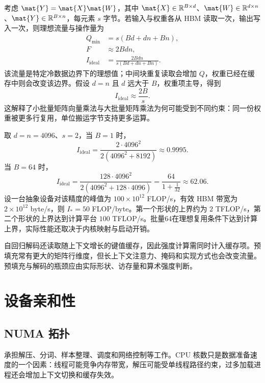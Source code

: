 \documentclass[../textbook.tex]{subfiles}
\begin{document}
\begin{example}[矩阵乘法的批量与算术强度]


考虑 $\mat{Y}=\mat{X}\mat{W}$，其中 $\mat{X}\in\mathbb R^{B\times d}$、$\mat{W}\in\mathbb R^{d\times n}$、$\mat{Y}\in\mathbb R^{B\times n}$，每元素 $s$ 字节。若输入与权重各从 HBM 读取一次，输出写入一次，则理想流量与操作量为
\begin{align*}
 Q_{\min} &= s(Bd+dn+Bn), \\
 F &\approx 2Bdn, \\
 I_{\mathrm{ideal}} &= \frac{2Bdn}{s(Bd+dn+Bn)}.
\end{align*}
该流量是特定冷数据边界下的理想值；中间块重复读取会增加 $Q$，权重已经在缓存中则会改变该边界。假设 $d=n$ 且 $d$ 远大于 $B$，权重项主导，得到
\begin{equation*}
 I_{\mathrm{ideal}}\approx\frac{2B}{s}.
\end{equation*}
这解释了小批量矩阵向量乘法与大批量矩阵乘法为何可能受到不同约束：同一份权重被更多行复用，单位搬运字节支持更多运算。

取 $d=n=4096$、$s=2$，当 $B=1$ 时，
\begin{equation*}
 I_{\mathrm{ideal}}=\frac{2\cdot4096^2}{2(4096^2+8192)}\approx0.9995.
\end{equation*}
当 $B=64$ 时，
\begin{equation*}
 I_{\mathrm{ideal}}=\frac{128\cdot4096^2}{2(4096^2+128\cdot4096)}
 =\frac{64}{1+\frac{1}{32}}\approx62.06.
\end{equation*}
设一台抽象设备对该精度的峰值为 $100\times10^{12}$ FLOP/s，有效 HBM 带宽为 $2\times10^{12}$ byte/s，则 $I_*=50$ FLOP/byte。第一个形状的上界约为 $2$ TFLOP/s，第二个形状的上界达到计算平台 $100$ TFLOP/s。批量64在理想复用条件下达到计算上界，实际性能还取决于内核映射与启动开销。

自回归解码还读取随上下文增长的键值缓存，因此强度计算需同时计入缓存项。预填充常有更大的矩阵行维度，但长上下文注意力、掩码和实现方式也会改变流量。预填充与解码的瓶颈应由实际形状、访存量和算术强度判断。
\end{example}

\section{设备亲和性}

\subsection{NUMA 拓扑}
承担解压、分词、样本整理、调度和网络控制等工作。CPU 核数只是数据准备速度的一个因素：线程可能竞争内存带宽，解压可能受单线程路径约束，过多加载进程还会增加上下文切换和缓存失效。
\end{document}

